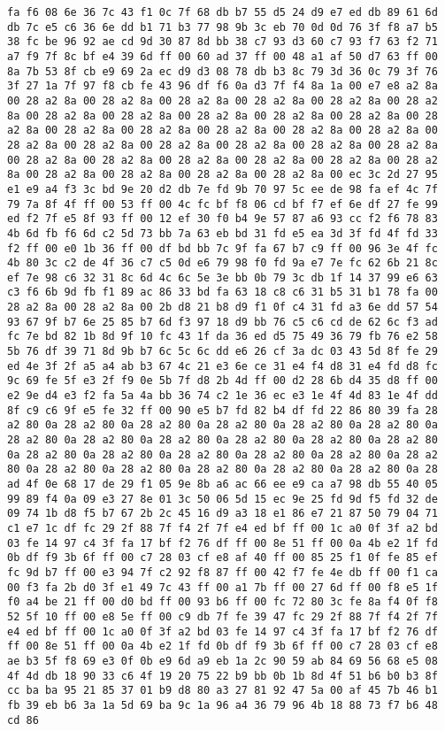 \documentclass{article}
\begin{document}
\begin{verbatim}
fa f6 08 6e 36 7c 43 f1 0c 7f 68 db b7 55 d5 24 d9 e7 ed db 89 61 6d db 7c e5 c6 36 6e dd b1 71 b3 77 98 9b 3c eb 70 0d 0d 76 3f f8 a7 b5 38 fc be 96 92 ae cd 9d 30 87 8d bb 38 c7 93 d3 60 c7 93 f7 63 f2 71 a7 f9 7f 8c bf e4 39 6d ff 00 60 ad 37 ff 00 48 a1 af 50 d7 63 ff 00 8a 7b 53 8f cb e9 69 2a ec d9 d3 08 78 db b3 8c 79 3d 36 0c 79 3f 76 3f 27 1a 7f 97 f8 cb fe 43 96 df f6 0a d3 7f f4 8a 1a 00 e7 e8 a2 8a 00 28 a2 8a 00 28 a2 8a 00 28 a2 8a 00 28 a2 8a 00 28 a2 8a 00 28 a2 8a 00 28 a2 8a 00 28 a2 8a 00 28 a2 8a 00 28 a2 8a 00 28 a2 8a 00 28 a2 8a 00 28 a2 8a 00 28 a2 8a 00 28 a2 8a 00 28 a2 8a 00 28 a2 8a 00 28 a2 8a 00 28 a2 8a 00 28 a2 8a 00 28 a2 8a 00 28 a2 8a 00 28 a2 8a 00 28 a2 8a 00 28 a2 8a 00 28 a2 8a 00 28 a2 8a 00 28 a2 8a 00 28 a2 8a 00 28 a2 8a 00 28 a2 8a 00 28 a2 8a 00 28 a2 8a 00 ec 3c 2d 27 95 e1 e9 a4 f3 3c bd 9e 20 d2 db 7e fd 9b 70 97 5c ee de 98 fa ef 4c 7f 79 7a 8f 4f ff 00 53 ff 00 4c fc bf f8 06 cd bf f7 ef 6e df 27 fe 99 ed f2 7f e5 8f 93 ff 00 12 ef 30 f0 b4 9e 57 87 a6 93 cc f2 f6 78 83 4b 6d fb f6 6d c2 5d 73 bb 7a 63 eb bd 31 fd e5 ea 3d 3f fd 4f fd 33 f2 ff 00 e0 1b 36 ff 00 df bd bb 7c 9f fa 67 b7 c9 ff 00 96 3e 4f fc 4b 80 3c c2 de 4f 36 c7 c5 0d e6 79 98 f0 fd 9a e7 7e fc 62 6b 21 8c ef 7e 98 c6 32 31 8c 6d 4c 6c 5e 3e bb 0b 79 3c db 1f 14 37 99 e6 63 c3 f6 6b 9d fb f1 89 ac 86 33 bd fa 63 18 c8 c6 31 b5 31 b1 78 fa 00 28 a2 8a 00 28 a2 8a 00 2b d8 21 b8 d9 f1 0f c4 31 fd a3 6e dd 57 54 93 67 9f b7 6e 25 85 b7 6d f3 97 18 d9 bb 76 c5 c6 cd de 62 6c f3 ad fc 7e bd 82 1b 8d 9f 10 fc 43 1f da 36 ed d5 75 49 36 79 fb 76 e2 58 5b 76 df 39 71 8d 9b b7 6c 5c 6c dd e6 26 cf 3a dc 03 43 5d 8f fe 29 ed 4e 3f 2f a5 a4 ab b3 67 4c 21 e3 6e ce 31 e4 f4 d8 31 e4 fd d8 fc 9c 69 fe 5f e3 2f f9 0e 5b 7f d8 2b 4d ff 00 d2 28 6b d4 35 d8 ff 00 e2 9e d4 e3 f2 fa 5a 4a bb 36 74 c2 1e 36 ec e3 1e 4f 4d 83 1e 4f dd 8f c9 c6 9f e5 fe 32 ff 00 90 e5 b7 fd 82 b4 df fd 22 86 80 39 fa 28 a2 80 0a 28 a2 80 0a 28 a2 80 0a 28 a2 80 0a 28 a2 80 0a 28 a2 80 0a 28 a2 80 0a 28 a2 80 0a 28 a2 80 0a 28 a2 80 0a 28 a2 80 0a 28 a2 80 0a 28 a2 80 0a 28 a2 80 0a 28 a2 80 0a 28 a2 80 0a 28 a2 80 0a 28 a2 80 0a 28 a2 80 0a 28 a2 80 0a 28 a2 80 0a 28 a2 80 0a 28 a2 80 0a 28 ad 4f 0e 68 17 de 29 f1 05 9e 8b a6 ac 66 ee e9 ca a7 98 db 55 40 05 99 89 f4 0a 09 e3 27 8e 01 3c 50 06 5d 15 ec 9e 25 fd 9d f5 fd 32 de 09 74 1b d8 f5 b7 67 2b 2c 45 16 d9 a3 18 e1 86 e7 21 87 50 79 04 71 c1 e7 1c df fc 29 2f 88 7f f4 2f 7f e4 ed bf ff 00 1c a0 0f 3f a2 bd 03 fe 14 97 c4 3f fa 17 bf f2 76 df ff 00 8e 51 ff 00 0a 4b e2 1f fd 0b df f9 3b 6f ff 00 c7 28 03 cf e8 af 40 ff 00 85 25 f1 0f fe 85 ef fc 9d b7 ff 00 e3 94 7f c2 92 f8 87 ff 00 42 f7 fe 4e db ff 00 f1 ca 00 f3 fa 2b d0 3f e1 49 7c 43 ff 00 a1 7b ff 00 27 6d ff 00 f8 e5 1f f0 a4 be 21 ff 00 d0 bd ff 00 93 b6 ff 00 fc 72 80 3c fe 8a f4 0f f8 52 5f 10 ff 00 e8 5e ff 00 c9 db 7f fe 39 47 fc 29 2f 88 7f f4 2f 7f e4 ed bf ff 00 1c a0 0f 3f a2 bd 03 fe 14 97 c4 3f fa 17 bf f2 76 df ff 00 8e 51 ff 00 0a 4b e2 1f fd 0b df f9 3b 6f ff 00 c7 28 03 cf e8 ae b3 5f f8 69 e3 0f 0b e9 6d a9 eb 1a 2c 90 59 ab 84 69 56 68 e5 08 4f 4d db 18 90 33 c6 4f 19 20 75 22 b9 bb 0b 1b 8d 4f 51 b6 b0 b3 8f cc ba ba 95 21 85 37 01 b9 d8 80 a3 27 81 92 47 5a 00 af 45 7b 46 b1 fb 39 eb b6 3a 1a 5d 69 ba 9c 1a 96 a4 36 79 96 4b 18 88 73 f7 b6 48 cd 86 
\end{verbatim}
\end{document}
